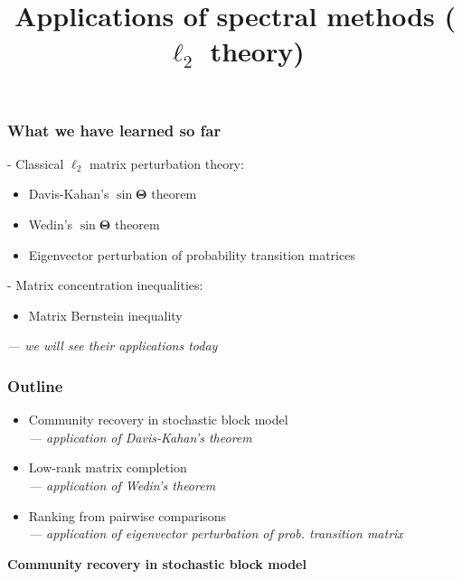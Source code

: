 \documentclass[compress,
mathserif,wide,%
]{beamer}
\title %
{Applications of spectral methods ($\ell_{2}$ theory)}
\begin{document}
\begin{frame}[plain]
  \titlepage

\end{frame}

\begin{frame}
	\frametitle{What we have learned so far}
	
	- Classical $\ell_{2}$ matrix perturbation theory: 
	\begin{itemize}
		\item Davis-Kahan's $\sin \bm{\Theta}$ theorem 				\item Wedin's $\sin \bm{\Theta}$ theorem 		
		\item Eigenvector perturbation of probability transition matrices
	\end{itemize}
	
	\vfill 
	- Matrix concentration inequalities:
	\begin{itemize}
		\item Matrix Bernstein inequality
	\end{itemize}
	
	\vfill
	\pause
	{\hfill \em --- we will see their applications today}
\end{frame}

\begin{frame}
\frametitle{Outline}

\begin{itemize}
  \itemsep1em
  \item Community recovery in stochastic block model \\
  	{\footnotesize \hfill \em --- application of Davis-Kahan's theorem}
  \item Low-rank matrix completion \\
  	{\footnotesize \hfill \em --- application of Wedin's theorem}
  \item Ranking from pairwise comparisons \\
  	{\footnotesize \hfill \em --- application of eigenvector perturbation of prob. transition matrix}
\end{itemize}

\end{frame}


\begin{frame}[plain]
	\vfill
	\centering
	\large \bf Community recovery in stochastic block model
	\vfill
\end{frame}
\end{document}
